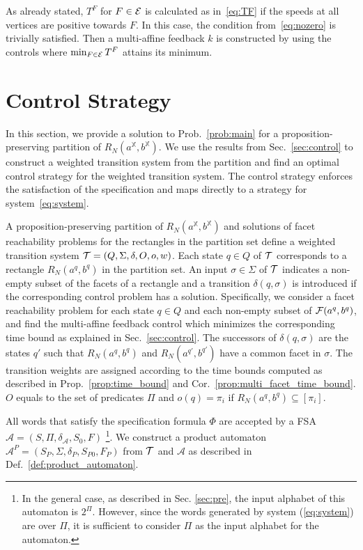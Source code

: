 \documentclass{ifacconf}
\newcommand{\RNset}{R_N(a^{\mathbb{X}},b^{\mathbb{X}})}
\newcommand{\TS}{{\cal T}}
\newcommand{\AUTOMATON}{\ensuremath{\mathcal{A}}}
\newcommand{\Fset}{{\cal E}}
\newcommand{\PREDSET}{\ensuremath{\Pi}}
\begin{document}
As already stated, $T^F$ for $F \in \Fset$ is calculated as in~\eqref{eq:TF} if the speeds at all vertices are positive towards $F$. In this case, the condition from~\eqref{eq:nozero} is trivially satisfied. Then a multi-affine feedback $k$ is constructed by using the controls where $\min_{F \in \Fset} T^F$ attains its minimum. 

\section{Control Strategy}\label{sec:controlStrategy}

In this section, we provide a solution to Prob.~\ref{prob:main} for a proposition-preserving partition of $\RNset$. We use the results from Sec.~\ref{sec:control} to construct a weighted transition system from the partition and find an optimal control strategy for the weighted transition system. The control strategy enforces the satisfaction of the specification and maps directly to a strategy for system~\eqref{eq:system}.



A proposition-preserving partition of $\RNset$ and solutions of facet reachability problems for the rectangles in the partition set define a weighted transition system $\TS=(Q, \Sigma, \delta, O, o, w)$.
Each state $q\in Q$ of $\TS$ corresponds to a rectangle $R_N(a^q, b^q)$ in the partition set. 
An input $\sigma \in \Sigma$ of $\TS$ indicates a non-empty subset of the facets of a rectangle and a transition $\delta(q, \sigma)$ is introduced if the corresponding control problem has a solution. 
Specifically, we consider a facet reachability problem for each state $q \in Q$ and each non-empty subset of ${\cal F}(a^q,b^q)$, and find the multi-affine feedback control which minimizes the corresponding time bound as explained in Sec.~\ref{sec:control}.
The successors of  $\delta(q, \sigma)$ are the states $q'$ such that $R_N(a^q, b^q)$ and $R_N(a^{q'}, b^{q'})$ have a common facet in $\sigma$. 
The transition weights are assigned according to the time bounds computed as described in Prop.~\ref{prop:time_bound} and Cor.~\ref{prop:multi_facet_time_bound}. $O$ equals to the set of predicates $\PREDSET$ and $o(q) = \pi_i$ if $R_N(a^q,b^q) \subseteq [\pi_i]$.

All words that satisfy the specification formula $\Phi$ are accepted by a FSA $\AUTOMATON = (S, \PREDSET, \delta_\AUTOMATON, S_0, F)$ \footnote{In the general case, as described in Sec. \ref{sec:pre}, the input alphabet of this automaton is $2^\PREDSET$. However, since the words generated by system (\ref{eq:system})
are over $\PREDSET$, it is sufficient to consider $\PREDSET$ as the input alphabet for the automaton.}. We construct a product automaton  $\AUTOMATON^P = (S_P, \Sigma, \delta_P, S_{P0}, F_P)$ from $\TS$ and $\AUTOMATON$ as described in Def.~\ref{def:product_automaton}.
\end{document}
